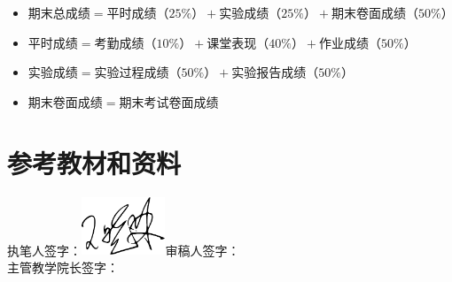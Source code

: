 \documentclass{swfusyllabus}
\begin{document}
\begin{itemize}
\item \(期末总成绩=平时成绩（25\%）+实验成绩（25\%）+期末卷面成绩（50\%）\)
\item \(平时成绩=考勤成绩（10\%）+课堂表现（40\%）+作业成绩（50\%）\)
\item \(实验成绩 = 实验过程成绩（50\%）+ 实验报告成绩（50\%）\)
\item \(期末卷面成绩 = 期末考试卷面成绩\)
\end{itemize}

\section{参考教材和资料}


\booklist{}

\vfill
\begin{flushright}
  执笔人签字：\includegraphics[width=25mm]{signature}\qquad 审稿人签字：\makebox[2cm][c]{}\\
  主管教学院长签字：\makebox[2cm][c]{}
\end{flushright}
\end{document}
